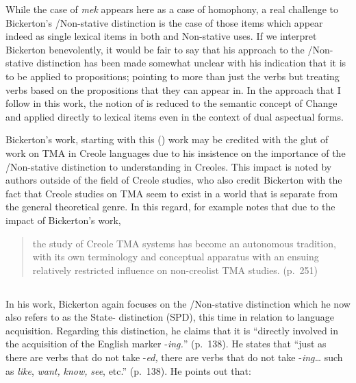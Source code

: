 While the case of \textit{mek} appears here as a case of homophony, a
real challenge to Bickerton’s \slash Non-stative distinction is the
case of those items which appear indeed as single lexical items in
both  and Non-stative uses.  If we interpret Bickerton
benevolently, it would be fair to say that his approach to the
\slash Non-stative distinction has been made somewhat unclear with
his indication that it is to be applied to propositions; pointing to
more than just the verbs but treating verbs based on the propositions
that they can appear in.  In the approach that I follow in this work,
the notion of  is reduced to the semantic concept of Change
and applied directly to lexical items even in the context of dual
aspectual forms.

Bickerton’s work, starting with this (\citeyear{Bickerton1975}) work may be credited with the glut of work on TMA in Creole languages due to his insistence on
the importance of the \slash Non-stative distinction to understanding
 in Creoles.  This impact is noted by authors outside of the
field of Creole studies, who also credit Bickerton with the fact that
Creole studies on TMA seem to exist in a world that is separate from
the general theoretical genre.  In this regard, \citet{Dahl1993} for
example notes that due to the impact of Bickerton’s work,

\begin{quote}
the study of Creole TMA systems has become an autonomous tradition,
with its own terminology and conceptual apparatus with an ensuing
relatively restricted influence on non-creolist TMA studies. (p.~251)
\end{quote}

\subsection{\citet{Bickerton1981}}\label{sec:2.1.3.1}

In his \citeyear{Bickerton1981} work, Bickerton again focuses on the \slash Non-stative
distinction which he now also refers to as the State-
distinction (SPD), this time in relation to language acquisition.
Regarding this distinction, he claims that it is ``directly involved in
the acquisition of the English  marker -\textit{ing.}”
(p.~138).  He states that ``just as there are verbs that do not take
-\textit{ed,} there are verbs that do not take -\textit{ing…} such as
\textit{like}, \textit{want,} \textit{know,} \textit{see},
etc.” (p.~138).  He points out that:

